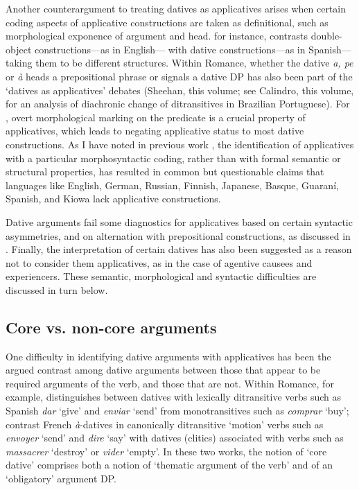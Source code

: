 \documentclass[output=paper,colorlinks,citecolor=brown,nonflat]{./langscibook}
\begin{document}
Another counterargument to treating datives as applicatives arises when certain coding aspects of applicative constructions are taken as definitional, such as morphological exponence of argument and head. \citet{Snyder1995} for instance, contrasts double-object constructions—as in English— with dative constructions—as in Spanish— taking them to be different structures. Within Romance, whether the dative \textit{a, pe} or \textit{à} heads a prepositional phrase or signals a dative DP has also been part of the ‘datives as applicatives’ debates (Sheehan, this volume; see Calindro, this volume, for an analysis of diachronic change of ditransitives in Brazilian Portuguese). For \citet{Polinsky2013}, overt morphological marking on the predicate is a crucial property of applicatives, which leads to negating applicative status to most dative constructions. As I have noted in previous work \citep[131]{Cuervo2015Chapter}, the identification of applicatives with a particular morphosyntactic coding, rather than with formal semantic or structural properties, has resulted in common but questionable claims that languages like English, German, Russian, Finnish, Japanese, Basque, Guaraní, Spanish, and Kiowa lack applicative constructions.

Dative arguments fail some diagnostics for applicatives based on certain syntactic asymmetries, and on alternation with prepositional constructions, as discussed in . Finally, the interpretation of certain datives has also been suggested as a reason not to consider them applicatives, as in the case of agentive causees \citep{Tubino2012} and experiencers.  These semantic, morphological and syntactic difficulties are discussed in turn below. 

\subsection{Core vs. non-core arguments}\label{sec:cuervo:2.1}

One difficulty in identifying dative arguments with applicatives has been the argued contrast among dative arguments between those that appear to be required arguments of the verb, and those that are not. Within Romance, for example, \citet{Pujalte2009} distinguishes between datives with lexically ditransitive verbs such as Spanish \textit{dar} ‘give’ and \textit{enviar} ‘send’ from monotransitives such as \textit{comprar} ‘buy’; \citet{BonehNash2012} contrast French \textit{à}-datives in canonically ditransitive ‘motion’ verbs such as \textit{envoyer} ‘send’ and \textit{dire} ‘say’ with datives (clitics) associated with verbs such as \textit{massacrer} ‘destroy’ or \textit{vider} ‘empty’. In these two works, the notion of ‘core dative’ comprises both a notion of ‘thematic argument of the verb’ and of an ‘obligatory’ argument DP.  
\end{document}
